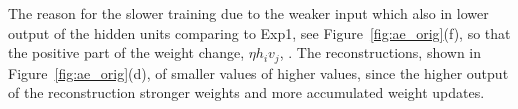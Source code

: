 The reason for the slower training \DIFdelbegin {}\DIFdelend \DIFaddbegin {}\DIFaddend due to the weaker input which also \DIFdelbegin {}\DIFdelend \DIFaddbegin {}\DIFaddend in lower output of the hidden units comparing to Exp1, see Figure~\ref{fig:ae_orig}(f), so that the positive part of the weight change, $\eta h_i v_j$, \DIFdelbegin {}\DIFdelend \DIFaddbegin {}\DIFaddend . 
The reconstructions, shown in Figure~\ref{fig:ae_orig}(d), of smaller values \DIFdelbegin {}\DIFdelend \DIFaddbegin {}\DIFaddend of higher values, since the higher output of the reconstruction \DIFdelbegin {}\DIFdelend \DIFaddbegin {}\DIFaddend stronger weights and more accumulated weight updates. 
